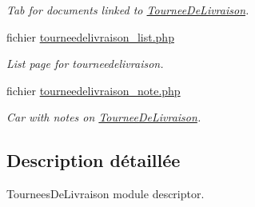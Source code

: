 \begin{DoxyCompactItemize}
\begin{DoxyCompactList}\small\item\em Tab for documents linked to \hyperlink{classTourneeDeLivraison}{Tournee\+De\+Livraison}. \end{DoxyCompactList}\item 
fichier \hyperlink{tourneedelivraison__list_8php}{tourneedelivraison\+\_\+list.\+php}
\begin{DoxyCompactList}\small\item\em List page for tourneedelivraison. \end{DoxyCompactList}\item 
fichier \hyperlink{tourneedelivraison__note_8php}{tourneedelivraison\+\_\+note.\+php}
\begin{DoxyCompactList}\small\item\em Car with notes on \hyperlink{classTourneeDeLivraison}{Tournee\+De\+Livraison}. \end{DoxyCompactList}\end{DoxyCompactItemize}


\subsection{Description détaillée}
Tournees\+De\+Livraison module descriptor. 

